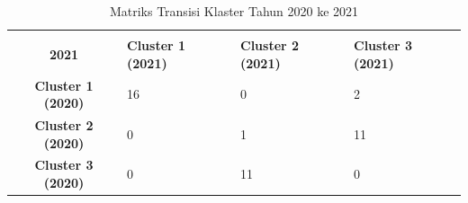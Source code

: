 \begin{table}[H]
\centering
\caption{Matriks Transisi Klaster Tahun 2020 ke 2021} \label{tab:transisi_2020_2021}
\begin{tabular}{|c|p{2cm}|p{2cm}|p{2cm}|}
\hline
\makecell{\textbf{Tahun 2020} \\ \textbf{2021}} & \textbf{Cluster 1 (2021)} & \textbf{Cluster 2 (2021)} & \textbf{Cluster 3 (2021)} \\ \hline
\textbf{Cluster 1 (2020)} & 16 & 0 & 2 \\ \hline
\textbf{Cluster 2 (2020)} & 0 & 1 & 11 \\ \hline
\textbf{Cluster 3 (2020)} & 0 & 11 & 0 \\ \hline
\end{tabular}
\end{table}